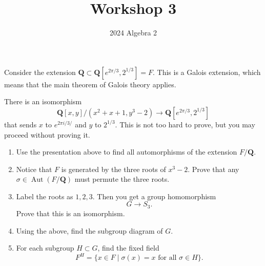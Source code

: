 \documentclass[12pt]{amsart}
\author{2024 Algebra 2}
\date{}
\title{Workshop 3}
\begin{document}
\maketitle
Consider the extension \(\mathbf{Q} \subset \mathbf{Q}[e^{2\pi/3}, 2^{1/3}] = F\).
This is a Galois extension, which means that the main theorem of Galois theory applies.

There is an isomorphism
\[ \mathbf{Q}[x,y]/(x^2+x+1, y^3-2) \to \mathbf{Q}[e^{2\pi/3}, 2^{1/3}]\]
that sends \(x\) to \(e^{2\pi i /3/}\) and \(y\) to \(2^{1/3}\).
This is not too hard to prove, but you may proceed without proving it.

\begin{enumerate}
\item Use the presentation above to find all automorphisms of the extension \(F/\mathbf{Q}\).

\item Notice that \(F\) is generated by the three roots of \(x^3-2\).
Prove that any \(\sigma \in \operatorname{Aut}(F/\mathbf{Q})\) must permute the three roots.

\item Label the roots as \(1, 2, 3\).
Then you get a group homomorphism
\[ G  \to S_3.\]
Prove that this is an isomorphism.

\item Using the above, find the subgroup diagram of \(G\).

\item For each subgroup \(H \subset G\), find the fixed field
\[ F^H = \{x \in F \mid \sigma (x) = x \text{ for all } \sigma \in H\}.\]
\end{enumerate}
\end{document}
